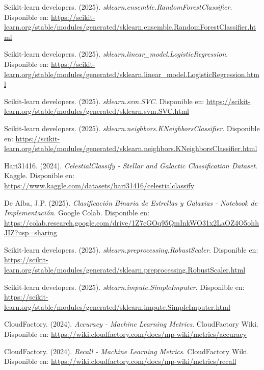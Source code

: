 \documentclass{article}
\begin{document}
\newpage

\begin{thebibliography}{9}

Scikit-learn developers. (2025). \textit{sklearn.ensemble.RandomForestClassifier}. 
Disponible en: \url{https://scikit-learn.org/stable/modules/generated/sklearn.ensemble.RandomForestClassifier.html}

Scikit-learn developers. (2025). \textit{sklearn.linear\_model.LogisticRegression}. 
Disponible en: \url{https://scikit-learn.org/stable/modules/generated/sklearn.linear_model.LogisticRegression.html}

Scikit-learn developers. (2025). \textit{sklearn.svm.SVC}. 
Disponible en: \url{https://scikit-learn.org/stable/modules/generated/sklearn.svm.SVC.html}

Scikit-learn developers. (2025). \textit{sklearn.neighbors.KNeighborsClassifier}. 
Disponible en: \url{https://scikit-learn.org/stable/modules/generated/sklearn.neighbors.KNeighborsClassifier.html}

Hari31416. (2024). \textit{CelestialClassify - Stellar and Galactic Classification Dataset}. Kaggle. 
Disponible en: \url{https://www.kaggle.com/datasets/hari31416/celestialclassify}

De Alba, J.P. (2025). \textit{Clasificación Binaria de Estrellas y Galaxias - Notebook de Implementación}. Google Colab. 
Disponible en: \url{https://colab.research.google.com/drive/1Z7cGOq95QmInkWO31x2LaOZ4O5ohhJIZ?usp=sharing}

Scikit-learn developers. (2025). \textit{sklearn.preprocessing.RobustScaler}. 
Disponible en: \url{https://scikit-learn.org/stable/modules/generated/sklearn.preprocessing.RobustScaler.html}

Scikit-learn developers. (2025). \textit{sklearn.impute.SimpleImputer}. 
Disponible en: \url{https://scikit-learn.org/stable/modules/generated/sklearn.impute.SimpleImputer.html}

CloudFactory. (2024). \textit{Accuracy - Machine Learning Metrics}. CloudFactory Wiki. 
Disponible en: \url{https://wiki.cloudfactory.com/docs/mp-wiki/metrics/accuracy}

CloudFactory. (2024). \textit{Recall - Machine Learning Metrics}. CloudFactory Wiki. 
Disponible en: \url{https://wiki.cloudfactory.com/docs/mp-wiki/metrics/recall}


\end{thebibliography}
\end{document}
